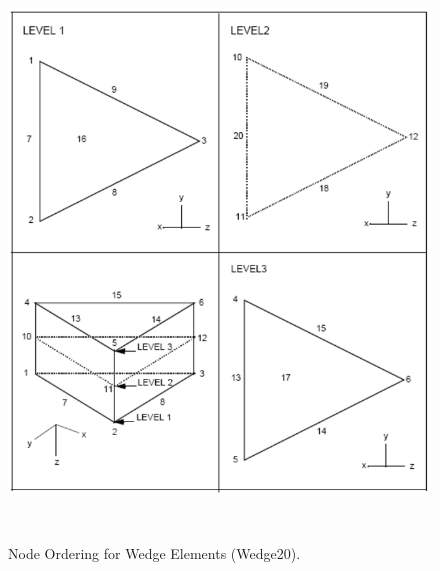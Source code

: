\begin{figure}
\begin{center}
\includegraphics[width=6.000in, height=6.000in]{topology/wedge20.png}
\caption{Node Ordering for Wedge Elements (Wedge20).}\label{topology:wedge20}
\end{center}
\end{figure}


